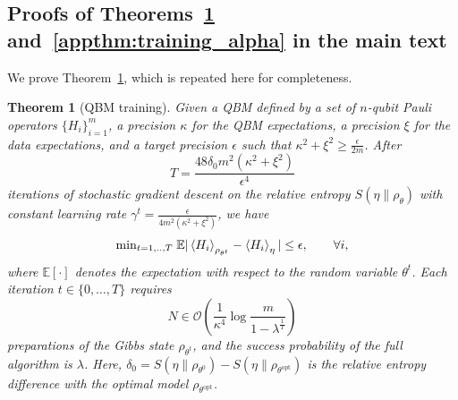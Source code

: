 \documentclass[
    reprint,
    aps,
    prx,
    longbibliography
]{revtex4-2}
\newtheorem{theorem}{Theorem}
\begin{document}
\subsection*{Proofs of Theorems~\ref{appthm:training} and~\ref{appthm:training_alpha} in the main text}

We prove Theorem~\ref{appthm:training}, which is repeated here for completeness. 

\begingroup
\def\thetheorem{1}
\begin{theorem}[QBM training]\label{appthm:training}
Given a QBM defined by a set of $n$-qubit Pauli operators $\{H_i\}_{i=1}^m$, a precision $\kappa$ for the QBM expectations, a precision $\xi$ for the data expectations, and a target precision $\epsilon$ such that $\kappa^2 + \xi^2 \geq \frac{\epsilon}{2m}$. After 
\begin{equation}
    T = \frac{48\delta_0 m^2  (\kappa^2 + \xi^2 )}{\epsilon^4}
\end{equation} 
iterations of stochastic gradient descent on the relative entropy $S(\eta \|\rho_\theta)$ with constant learning rate $\gamma^t=\frac{\epsilon}{4m^2(\kappa^2+\xi^2)}$, we have
\begin{equation}
    \mathrm{min}_{t=1,..,T} \; \mathbb{E}| \expval{H_i}_{\rho_{\theta^t}}  - \expval{H_i}_\eta | \leq \epsilon, \qquad \forall i,
\end{equation} where $\mathbb{E}[\cdot]$ denotes the expectation with respect to the random variable $\theta^t$. 
Each iteration $t \in \{0, \dots, T\}$ requires
\begin{equation}
\label{eq:copies_app}
    N \in \mathcal{O} \left( \frac{1}{{\kappa^4}} \log \frac{ m} { 1-\lambda^{\frac{1}{T}} } \right)
\end{equation}
preparations of the Gibbs state $\rho_{\theta^t}$, and the success probability of the full algorithm is $\lambda$. Here, $\delta_0 = S(\eta\|\rho_{\theta^0})-S(\eta\|\rho_{\theta^\mathrm{opt}})$ is the relative entropy difference with the optimal model $\rho_{\theta^\mathrm{opt}}$.
\end{theorem}
\endgroup
\end{document}
